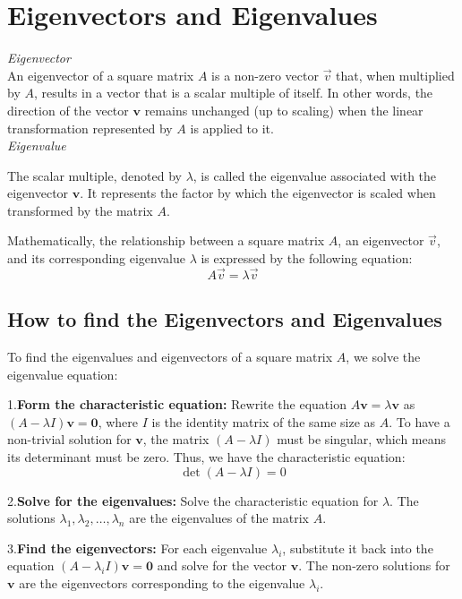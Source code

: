 \newpage
\section{Eigenvectors and Eigenvalues}

\emph{Eigenvector}
\\
An eigenvector of a square matrix \(A\) is a non-zero vector \(\vec{v}\) that, when multiplied by \(A\), results in a vector that is a scalar multiple of itself. In other words, the direction of the vector \(\mathbf{v}\) remains unchanged (up to scaling) when the linear transformation represented by \(A\) is applied to it.
\\
\emph{Eigenvalue}

The scalar multiple, denoted by \(\lambda\), is called the eigenvalue associated with the eigenvector \(\mathbf{v}\). It represents the factor by which the eigenvector is scaled when transformed by the matrix \(A\).

Mathematically, the relationship between a square matrix \(A\), an eigenvector \(\vec{v}\), and its corresponding eigenvalue \(\lambda\) is expressed by the following equation:
\[
A\vec{v} = \lambda\vec{v}
\]

\subsection{How to find the Eigenvectors and Eigenvalues}

To find the eigenvalues and eigenvectors of a square matrix \(A\), we solve the eigenvalue equation:

 1.\textbf{Form the characteristic equation:}
    Rewrite the equation \(A\mathbf{v} = \lambda\mathbf{v}\) as \((A - \lambda I)\mathbf{v} = \mathbf{0}\), where \(I\) is the identity matrix of the same size as \(A\). To have a non-trivial solution for \(\mathbf{v}\), the matrix \((A - \lambda I)\) must be singular, which means its determinant must be zero. Thus, we have the characteristic equation:
    \[
    \det(A - \lambda I) = 0
    \]

 2.\textbf{Solve for the eigenvalues:}
    Solve the characteristic equation for \(\lambda\). The solutions \(\lambda_1, \lambda_2, \dots, \lambda_n\) are the eigenvalues of the matrix \(A\).

 3.\textbf{Find the eigenvectors:}
    For each eigenvalue \(\lambda_i\), substitute it back into the equation \((A - \lambda_i I)\mathbf{v} = \mathbf{0}\) and solve for the vector \(\mathbf{v}\). The non-zero solutions for \(\mathbf{v}\) are the eigenvectors corresponding to the eigenvalue \(\lambda_i\).

